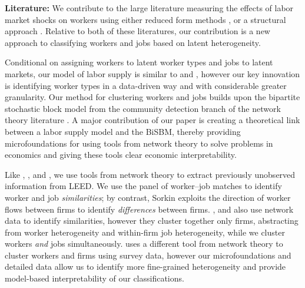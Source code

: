 \documentclass[12pt]{article}
\theoremstyle{definition}
\theoremstyle{plain}
\begin{document}


\textbf{Literature:} We contribute to the large literature measuring the effects of labor market shocks on workers using either reduced form methods \citep{AutorDornHanson2013,Card1990,AutorDornHansonSong2014,Yagan2017,BoundHolzer2000,BlanchardKatz1992,Bartik1991}, or a structural approach \citep{BursteinMoralesVogel2019,CaliendoDvorkinParro2019,GalleRodriguezclareYi2017,KimVogel2021}. Relative to both of these literatures, our contribution is a new approach to classifying workers and jobs based on latent heterogeneity.

Conditional on assigning workers to latent worker types and jobs to latent markets, our model of labor supply is similar to \citet{Grigsby2022} and \citet{BonhommeLamadonManresa2019_distributional}, however our key innovation is identifying worker types in a data-driven way and with considerable greater granularity. Our method for clustering workers and jobs builds upon the bipartite stochastic block model from the community detection branch of the network theory literature \citep{LarremoreClausetJacobs2014,Peixoto2019}. A major contribution of our paper is creating a theoretical link between a labor supply model and the BiSBM, thereby providing microfoundations for using tools from network theory to solve problems in economics and giving these tools clear economic interpretability. 


Like \citet{Sorkin2018}, \citet{Nimczik2018}, and \citet{JaroschNimczikSorkin2019}, we use tools from network theory to extract previously unobserved information from LEED. We use the panel of worker--job matches to identify worker and job \emph{similarities}; by contrast, Sorkin exploits the direction of worker flows between firms to identify \emph{differences} between firms. \citet{Nimczik2018}, and \citet{JaroschNimczikSorkin2019} also use network data to identify similarities, however they cluster together only firms, abstracting from worker heterogeneity and within-firm job heterogeneity, while we cluster workers \emph{and} jobs simultaneously. \citet{Schmutte2014} uses a different tool from network theory to cluster workers and firms using survey data, however our microfoundations and detailed data allow us to identify more fine-grained heterogeneity and provide model-based interpretability of our classifications. 
\end{document}
